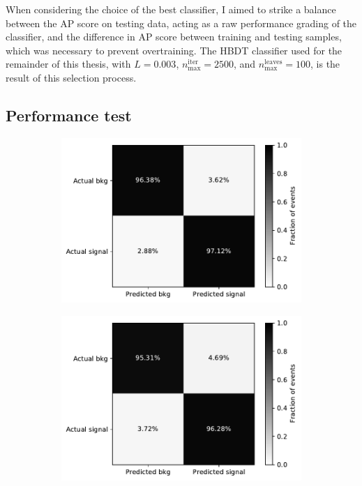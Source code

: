 When considering the choice of the best classifier, I aimed to strike a balance between the AP score on testing data, acting as a raw performance grading of the classifier, and the difference in AP score between training and testing samples, which was necessary to prevent overtraining.
The HBDT classifier used for the remainder of this thesis, with $L=0.003$, $n_\text{max}^\text{iter}=2500$, and $n_\text{max}^\text{leaves}=100$, is the result of this selection process.

\subsection{Performance test}

\begin{figure}[t]
	\centering
	\begin{subfigure}{.45\textwidth}
		\includegraphics[width=\textwidth]{graphics/04-event_selection/confmatrix_train.pdf}
		\caption{}
	\end{subfigure}
	\begin{subfigure}{.45\textwidth}
		\includegraphics[width=\textwidth]{graphics/04-event_selection/confmatrix_test.pdf}

\end{subfigure}
\end{figure}
